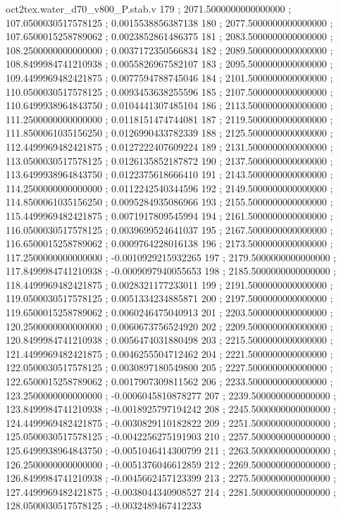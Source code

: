 \begin{filecontents}[overwrite]{oct2tex.water_d70_v800_P.stab.v}
179 ; 2071.5000000000000000 ; 107.0500030517578125 ; 0.0015538856387138
180 ; 2077.5000000000000000 ; 107.6500015258789062 ; 0.0023852861486375
181 ; 2083.5000000000000000 ; 108.2500000000000000 ; 0.0037172350566834
182 ; 2089.5000000000000000 ; 108.8499984741210938 ; 0.0055826967582107
183 ; 2095.5000000000000000 ; 109.4499969482421875 ; 0.0077594788745046
184 ; 2101.5000000000000000 ; 110.0500030517578125 ; 0.0093453638255596
185 ; 2107.5000000000000000 ; 110.6499938964843750 ; 0.0104441307485104
186 ; 2113.5000000000000000 ; 111.2500000000000000 ; 0.0118151474744081
187 ; 2119.5000000000000000 ; 111.8500061035156250 ; 0.0126990433782339
188 ; 2125.5000000000000000 ; 112.4499969482421875 ; 0.0127222407609224
189 ; 2131.5000000000000000 ; 113.0500030517578125 ; 0.0126135852187872
190 ; 2137.5000000000000000 ; 113.6499938964843750 ; 0.0122375618666410
191 ; 2143.5000000000000000 ; 114.2500000000000000 ; 0.0112242540344596
192 ; 2149.5000000000000000 ; 114.8500061035156250 ; 0.0095284935086966
193 ; 2155.5000000000000000 ; 115.4499969482421875 ; 0.0071917809545994
194 ; 2161.5000000000000000 ; 116.0500030517578125 ; 0.0039699524641037
195 ; 2167.5000000000000000 ; 116.6500015258789062 ; 0.0009764228016138
196 ; 2173.5000000000000000 ; 117.2500000000000000 ; -0.0010929215932265
197 ; 2179.5000000000000000 ; 117.8499984741210938 ; -0.0009097940055653
198 ; 2185.5000000000000000 ; 118.4499969482421875 ; 0.0028321177233011
199 ; 2191.5000000000000000 ; 119.0500030517578125 ; 0.0051334234885871
200 ; 2197.5000000000000000 ; 119.6500015258789062 ; 0.0060246475040913
201 ; 2203.5000000000000000 ; 120.2500000000000000 ; 0.0060673756524920
202 ; 2209.5000000000000000 ; 120.8499984741210938 ; 0.0056474031880498
203 ; 2215.5000000000000000 ; 121.4499969482421875 ; 0.0046255504712462
204 ; 2221.5000000000000000 ; 122.0500030517578125 ; 0.0030897180549800
205 ; 2227.5000000000000000 ; 122.6500015258789062 ; 0.0017907309811562
206 ; 2233.5000000000000000 ; 123.2500000000000000 ; -0.0006045810878277
207 ; 2239.5000000000000000 ; 123.8499984741210938 ; -0.0018925797194242
208 ; 2245.5000000000000000 ; 124.4499969482421875 ; -0.0030829110182822
209 ; 2251.5000000000000000 ; 125.0500030517578125 ; -0.0042256275191903
210 ; 2257.5000000000000000 ; 125.6499938964843750 ; -0.0051046414300799
211 ; 2263.5000000000000000 ; 126.2500000000000000 ; -0.0051376046612859
212 ; 2269.5000000000000000 ; 126.8499984741210938 ; -0.0045662457123399
213 ; 2275.5000000000000000 ; 127.4499969482421875 ; -0.0038044340908527
214 ; 2281.5000000000000000 ; 128.0500030517578125 ; -0.0032489467412233

\end{filecontents}
